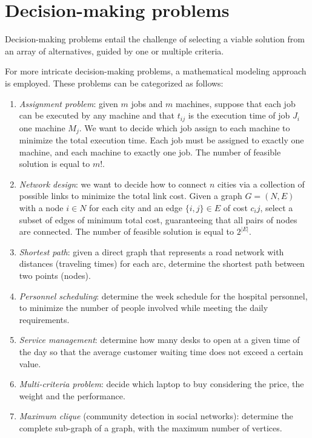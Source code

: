 \section{Decision-making problems}

\begin{definition}
    Decision-making problems entail the challenge of selecting a viable solution from an array of alternatives, guided by one or multiple criteria.
\end{definition}
For more intricate decision-making problems, a mathematical modeling approach is employed. 
These problems can be categorized as follows:
\begin{enumerate}
    \item \textit{Assignment problem}: given $m$ jobs and $m$ machines, suppose that each job can be executed by any machine and that $t_{ij}$ is the execution time of job $J_i$ one
        machine $M_j$. We want to decide which job assign to each machine to minimize the total execution time. Each job must be assigned to exactly one machine, and each 
        machine to exactly one job. The number of feasible solution is equal to $m!$. 
    \item \textit{Network design}: we want to decide how to connect $n$ cities via a collection of possible links to minimize the total link cost. 
        Given a graph $G=(N,E)$ with a node $i \in N$ for each city and an edge $\{i,j\} \in E$ of cost $c_ij$, select a subset of edges of minimum total cost, guaranteeing that 
        all pairs of nodes are connected. The number of feasible solution is equal to $2^{\left\lvert E \right\rvert}$. 
    \item \textit{Shortest path}: given a direct graph that represents a road network with distances (traveling times) for each arc, determine the shortest path between two points (nodes).
    \item \textit{Personnel scheduling}: determine the week schedule for the hospital personnel, to minimize the number of people involved while meeting the daily requirements.
    \item \textit{Service management}: determine how many desks to open at a given time of the day so that the average customer waiting time does not exceed a certain value. 
    \item \textit{Multi-criteria problem}: decide which laptop to buy considering the price, the weight and the performance. 
    \item \textit{Maximum clique} (community detection in social networks): determine the complete sub-graph of a graph, with the maximum number of vertices.
\end{enumerate}